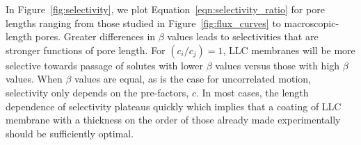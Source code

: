 \documentclass{article}
\begin{document}
  In Figure~\ref{fig:selectivity}, we plot Equation~\ref{eqn:selectivity_ratio} for pore
  lengths ranging from those studied in Figure~\ref{fig:flux_curves} to macroscopic-length
  pores. Greater differences in $\beta$ values leads to selectivities that are stronger 
  functions of pore length. For $(c_i / c_j)=1$, LLC membranes will be more selective
  towards passage of solutes with lower $\beta$ values versus those with high $\beta$ values.
  When $\beta$ values are equal, as is the case for uncorrelated motion, selectivity only
  depends on the pre-factors, $c$. In most cases, the length dependence of selectivity 
  plateaus quickly which implies that a coating of LLC membrane with a thickness on the 
  order of those already made experimentally should be sufficiently optimal. 
\end{document}
